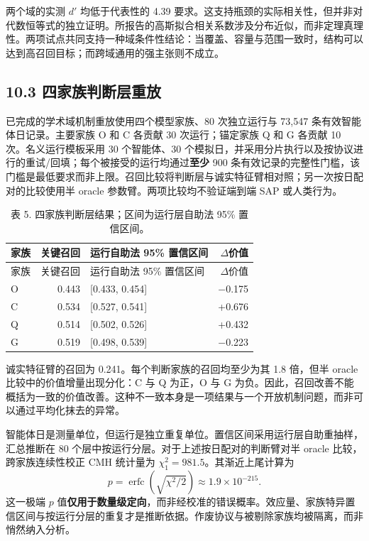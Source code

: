 \documentclass[
  chinese,
  11pt]{article}
\begin{document}
两个域的实测 \(d'\) 均低于代表性的 4.39 要求。这支持瓶颈的实际相关性，但并非对代数恒等式的独立证明。所报告的高斯拟合相关系数涉及分布近似，而非定理真理性。两项试点共同支持一种域条件性结论：当覆盖、容量与范围一致时，结构可以达到高召回目标；而跨域通用的强主张则不成立。

\subsection{10.3 四家族判断层重放}\label{ux56dbux5bb6ux65cfux5224ux65adux5c42ux91cdux653e}

已完成的学术域机制重放使用四个模型家族、80 次独立运行与 73,547 条有效智能体日记录。主要家族 O 和 C 各贡献 30 次运行；锚定家族 Q 和 G 各贡献 10 次。名义运行模板采用 30 个智能体、30 个模拟日，并采用分片执行以及按协议进行的重试/回填；每个被接受的运行均通过\textbf{至少} 900 条有效记录的完整性门槛，该门槛是最低要求而非上限。召回比较将判断层与诚实特征臂相对照；另一次按日配对的比较使用半 oracle 参数臂。两项比较均不验证端到端 SAP 或人类行为。

\begin{longtable}[]{@{}lrlr@{}}
\caption{表 5. 四家族判断层结果；区间为运行层自助法 95\% 置信区间。}\tabularnewline
\toprule\noalign{}
家族 & 关键召回 & 运行自助法 95\% 置信区间 & \(\Delta\)价值 \\
\midrule\noalign{}
\endfirsthead
\toprule\noalign{}
家族 & 关键召回 & 运行自助法 95\% 置信区间 & \(\Delta\)价值 \\
\midrule\noalign{}
\endhead
\bottomrule\noalign{}
\endlastfoot
O & 0.443 & {[}0.433, 0.454{]} & −0.175 \\
C & 0.534 & {[}0.527, 0.541{]} & +0.676 \\
Q & 0.514 & {[}0.502, 0.526{]} & +0.432 \\
G & 0.519 & {[}0.498, 0.539{]} & −0.223 \\
\end{longtable}

诚实特征臂的召回为 0.241。每个判断家族的召回均至少为其 1.8 倍，但半 oracle 比较中的价值增量出现分化：C 与 Q 为正，O 与 G 为负。因此，召回改善不能概括为一致的价值改善。这种不一致本身是一项结果与一个开放机制问题，而非可以通过平均化抹去的异常。

智能体日是测量单位，但运行是独立重复单位。置信区间采用运行层自助重抽样，汇总推断在 80 个层中按运行分层。对于上述按日配对的判断臂对半 oracle 比较，跨家族连续性校正 CMH 统计量为 \(\chi^2_1=981.5\)。其渐近上尾计算为 \[
p=\operatorname{erfc}\!\left(\sqrt{\chi^2/2}\right)
\approx1.9\times10^{-215}.
\] 这一极端 \(p\) 值\textbf{仅用于数量级定向}，而非经校准的错误概率。效应量、家族特异置信区间与按运行分层的重复才是推断依据。作废协议与被剔除家族均被隔离，而非悄然纳入分析。
\end{document}
